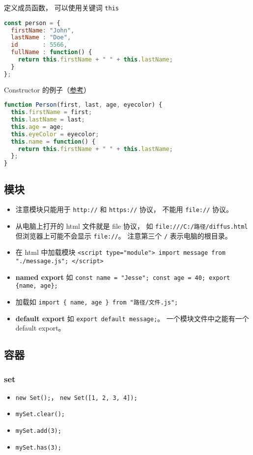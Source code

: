 定义成员函数， 可以使用关键词 \verb|this|
\begin{lstlisting}[language=js]
const person = {
  firstName: "John",
  lastName : "Doe",
  id       : 5566,
  fullName : function() {
    return this.firstName + " " + this.lastName;
  }
};
\end{lstlisting}

Constructor 的例子（\href{https://www.w3schools.com/js/js_object_constructors.asp}{参考}）
\begin{lstlisting}[language=js]
function Person(first, last, age, eyecolor) {
  this.firstName = first;
  this.lastName = last;
  this.age = age;
  this.eyeColor = eyecolor;
  this.name = function() {
    return this.firstName + " " + this.lastName;
  };
}
\end{lstlisting}

\subsection{模块}
\begin{itemize}
\item 注意模块只能用于 \verb|http://| 和 \verb|https://| 协议， 不能用 \verb|file://| 协议。
\item 从电脑上打开的 html 文件就是 file 协议， 如 \verb|file:///C:/路径/diffus.html| 但浏览器上可能不会显示 \verb|file://|。 注意第三个 \verb|/| 表示电脑的根目录。
\item 在 html 中加载模块 \verb|<script type="module"> import message from "./message.js"; </script>|
\item \textbf{named export} 如 \verb|const name = "Jesse"; const age = 40; export {name, age};|
\item 加载如 \verb|import { name, age } from "路径/文件.js";|
\item \textbf{default export} 如 \verb|export default message;|。 一个模块文件中之能有一个 default export。
\end{itemize}

\subsection{容器}
\subsubsection{set}
\begin{itemize}
\item \verb`new Set();`， \verb`new Set([1, 2, 3, 4]);`
\item \verb`mySet.clear();`
\item \verb`mySet.add(3);`
\item \verb`mySet.has(3);`
\end{itemize}


